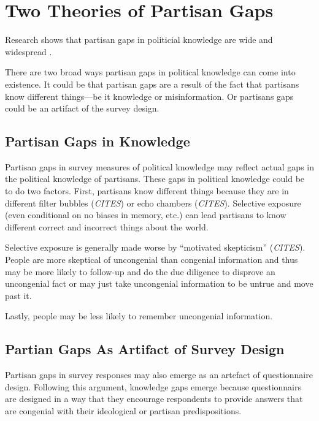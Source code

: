 \documentclass[12pt, letterpaper]{article}
\begin{document}
\section*{Two Theories of Partisan Gaps}

Research shows that partisan gaps in politicial knowledge are wide and widespread \citep{bartels_2002, jerit2012partisan, lodgetaber_2013}.

There are two broad ways partisan gaps in political knowledge can come into existence. It could be that partisan gaps are a result of the fact that partisans know different things---be it knowledge or misinformation. Or partisans gaps could be an artifact of the survey design. 

\subsection*{Partisan Gaps in Knowledge}
Partisan gaps in survey measures of political knowledge may reflect actual gaps in the political knowledge of partisans. These gaps in political knowledge could be to do two factors. First, partisans know different things because they are in different filter bubbles (\emph{CITES}) or echo chambers (\emph{CITES}). Selective exposure (even conditional on no biases in memory, etc.) can lead partisans to know different correct and incorrect things about the world.

Selective exposure is generally made worse by ``motivated skepticism'' (\emph{CITES}). People are more skeptical of uncongenial than congenial information and thus may be more likely to follow-up and do the due diligence to disprove an uncongenial fact or may just take uncongenial information to be untrue and move past it.

Lastly, people may be less likely to remember uncongenial information.

\subsection*{Partian Gaps As Artifact of Survey Design}
Partisan gaps in survey responses may also emerge as an artefact of questionnaire design. Following this argument, knowledge gaps emerge because questionnairs are designed in a way that they encourage respondents to provide answers that are congenial with their ideological or partisan predispositions. 
\end{document}
